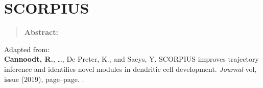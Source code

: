 \newpage{\thispagestyle{empty}\cleardoublepage}
\chapter{SCORPIUS} 
\label{chap:scorpius}

\begin{quote}
	\textbf{Abstract:} \blindtext
\end{quote}

\vfill

Adapted from:\\
\textbf{Cannoodt, R.}, \ldots, De Preter, K., and Saeys, Y. SCORPIUS improves trajectory inference and identifies novel modules in dendritic cell development. \textit{Journal} vol, issue (2019), page--page. .
\newpage

\blindtext